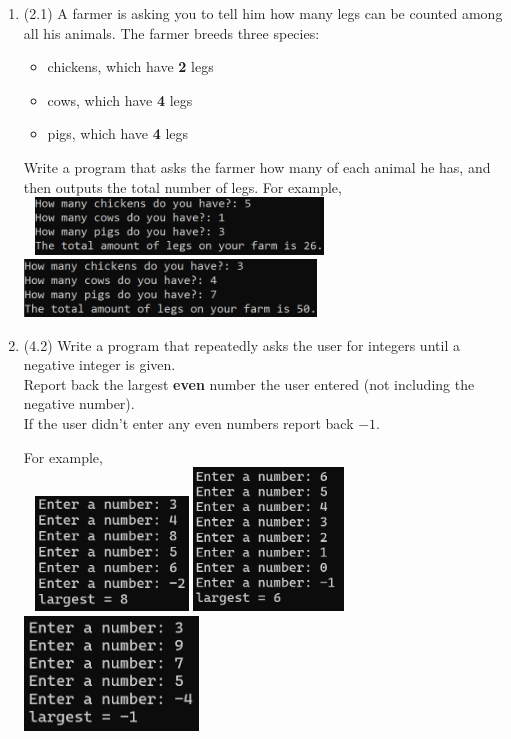 \documentclass{article}
\begin{document}
\begin{enumerate}
\item (2.1)
		A farmer is asking you to tell him how many legs can be counted among all his animals. 
		The farmer breeds three species:
		\begin{itemize}
			\item chickens, which have \textbf{2} legs
			\item cows, which have \textbf{4} legs
			\item pigs, which have \textbf{4} legs
		\end{itemize}
		Write a program that asks the farmer how many of each animal he has, and then outputs the
		total number of legs.  		
		For example, \\ \ \hfill
		\includegraphics[height = 0.6in]{./imgs/animalLegs_ex1.PNG} \hfill
		\includegraphics[height = 0.6in]{./imgs/animalLegs_ex2.PNG} \hfill \


\item (4.2)  
		Write a program that repeatedly asks the user for integers until a negative integer is 
		given.\\  Report back the largest \textbf{even} number the user entered 
		(not including the negative number).  \\
		If the user didn't enter any even numbers report back $-1$.

		For example, \\ \ \hfill
		\includegraphics[height = 1.2in]{./imgs/largestEven1.PNG} \hfill  
		\includegraphics[height = 1.5in]{./imgs/largestEven2.PNG} \hfill  
		\includegraphics[height = 1.2in]{./imgs/largestEven3.PNG} \hfill \


\end{enumerate}
\end{document}
